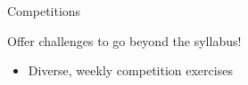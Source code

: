 \documentclass{beamer}
\begin{document}

\begin{frame}[fragile]{Competitions}
\centerline{\Large{\alert{Offer challenges to go beyond the syllabus!}}}
\pause
\begin{itemize}[<+->]
\item Diverse, weekly competition exercises
\end{itemize}
\end{frame}
\end{document}
